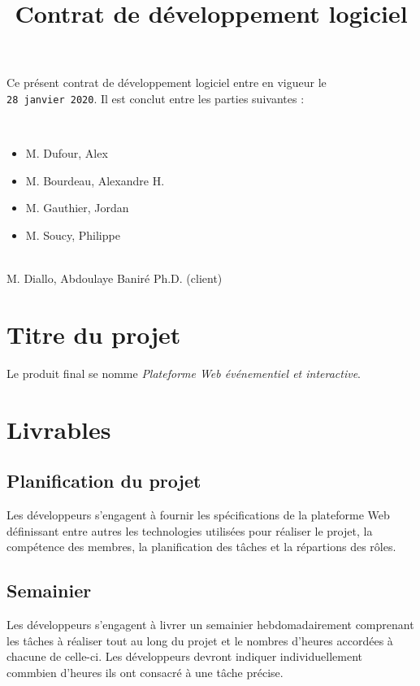 \documentclass[letter,12pt]{exam}
\title{Contrat de développement logiciel\\}
\date{}
\begin{document}
\maketitle

Ce présent contrat de développement logiciel entre en vigueur le
\texttt{28\ janvier\ 2020}. Il est conclut entre les parties suivantes :

\vspace{0.5cm}
\\

\begin{itemize}
\item[]  M. Dufour, Alex
\item[]  M. Bourdeau, Alexandre H.
\item[]  M. Gauthier, Jordan
\item[]  M. Soucy, Philippe
\end{itemize}

\vspace{0.5cm}
\\

M. Diallo, Abdoulaye Baniré
Ph.D. (client)


\section{Titre du projet}

Le produit final se nomme \emph{Plateforme Web événementiel et interactive}.


\section{Livrables}

\subsection{Planification du projet}

Les développeurs s'engagent à fournir les spécifications de la
plateforme Web définissant entre autres les technologies utilisées pour
réaliser le projet, la compétence des membres, la planification des
tâches et la répartions des rôles.

\subsection{Semainier}

Les développeurs s'engagent à livrer un semainier hebdomadairement
comprenant les tâches à réaliser tout au long du projet et le nombres
d'heures accordées à chacune de celle-ci. Les développeurs devront
indiquer individuellement commbien d'heures ils ont consacré à une tâche
précise.
\end{document}
